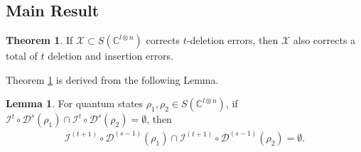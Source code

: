 \documentclass[reprint,amsmath,amssymb,aps,]{revtex4-2}
\theoremstyle{definition}
\newtheorem{lem}{Lemma}
\newtheorem{theo}{Theorem}
\newcommand{\SET}[1]{\mathbb{#1}}
\newcommand{\C}{\SET{C}}
\newcommand{\1}{\mbox{1}\hspace{-0.25em}\mbox{l}}%
\newcommand{\pure}[2]{\C^{#1 \otimes #2}}
\newcommand{\state}[2]{S(\pure{#1}{#2})}
\newcommand{\QU}[1]{\mathcal{#1}}
\begin{document}
\subsection{Main Result}
\begin{theo}
  \label{theo:1del_iff_1ins_2}
  If $\QU{X} \subset \state{l}{n}$ corrects $t$-deletion errors,
  then $\QU{X}$ also corrects a total of $t$ deletion and insertion errors.
\end{theo}

Theorem \ref{theo:1del_iff_1ins_2}
is derived
from the following Lemma.

\begin{lem}
  \label{lem:1del_iff_1ins_2}
  For quantum states $\rho_1, \rho_2 \in \state{l}{n}$,
  if $\QU{I}^{t} \circ \QU{D}^{s}(\rho_1) \cap \QU{I}^{t} \circ \QU{D}^{s}(\rho_2) =\emptyset$,
  then
  \begin{align*}
    \QU{I}^{(t+1)} \circ \QU{D}^{(s-1)}(\rho_1)
    \cap
    \QU{I}^{(t+1)} \circ \QU{D}^{(s-1)}(\rho_2)
    =
    \emptyset.
  \end{align*}
\end{lem}
\end{document}
